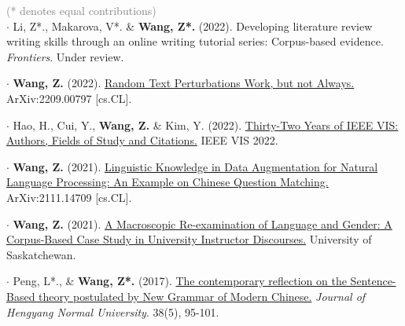 \documentclass[letterpaper,11pt]{article}
\newcommand{\resumeSubHeadingListStart}{\begin{itemize}[leftmargin=0.15in, label={}]}
\newcommand{\resumeSubHeadingListEnd}{\end{itemize}}
\begin{document}
  \resumeSubHeadingListStart
    \small{\item{
    \textcolor{gray}{(* denotes equal contributions)} \\ \vspace{2pt}
        $\cdot$ Li, Z*., Makarova, V*. \& \textbf{Wang, Z*.} (2022). Developing literature review writing skills through an online writing tutorial series: Corpus-based evidence. \emph{Frontiers}. Under review. \\ \vspace{2pt}
        
        $\cdot$ \textbf{Wang, Z.} (2022). \href{https://arxiv.org/abs/2209.00797}{Random Text Perturbations Work, but not Always.} ArXiv:2209.00797 [cs.CL]. \\ \vspace{2pt}
        
        $\cdot$ Hao, H., Cui, Y., \textbf{Wang, Z.} \& Kim, Y. (2022). \href{https://arxiv.org/abs/2208.03772}{Thirty-Two Years of IEEE VIS: Authors, Fields of Study and Citations.} IEEE VIS 2022. \\ \vspace{2pt}
        
        $\cdot$ \textbf{Wang, Z.} (2021). \href{https://arxiv.org/abs/2111.14709}{Linguistic Knowledge in Data Augmentation for Natural Language Processing: An Example on Chinese Question Matching.} ArXiv:2111.14709 [cs.CL]. \\ \vspace{2pt}
        
        $\cdot$ \textbf{Wang, Z.} (2021). \href{https://harvest.usask.ca/handle/10388/13387}{A Macroscopic Re-examination of Language and Gender: A Corpus-Based Case Study in University Instructor Discourses.} University of Saskatchewan. \\ \vspace{2pt}
        
        $\cdot$ Peng, L*., \& \textbf{Wang, Z*.} (2017). \href{https://www.researchgate.net/publication/340730935_The_contemporary_reflection_on_the_Sentence-Based_theory_postulated_by_New_Grammar_of_Modern_Chinese}{The contemporary reflection on the Sentence-Based theory postulated by New Grammar of Modern Chinese.} \emph{Journal of Hengyang Normal University}. 38(5), 95-101.
    }} \\ \vspace{-5pt}
  \resumeSubHeadingListEnd

\end{document}
